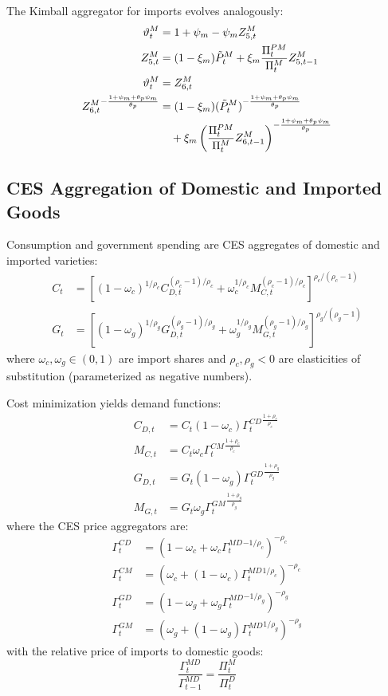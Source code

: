 \documentclass[12pt]{article}
\begin{document}
The Kimball aggregator for imports evolves analogously:
\begin{align}
\vartheta_t^M &= 1 + \psi_m - \psi_m Z_{5,t}^M \\
Z_{5,t}^M &= (1-\xi_m) \tilde{P}_t^M + \xi_m \frac{\Pi_t^{PM}}{\Pi_t^M} Z_{5,t-1}^M \\
\vartheta_t^M &= Z_{6,t}^M \\
Z_{6,t}^M {}^{-\frac{1+\psi_m+\theta_p\psi_m}{\theta_p}} &= (1-\xi_m) (\tilde{P}_t^M)^{-\frac{1+\psi_m+\theta_p\psi_m}{\theta_p}} \notag \\
&\quad + \xi_m \left( \frac{\Pi_t^{PM}}{\Pi_t^M} Z_{6,t-1}^M \right)^{-\frac{1+\psi_m+\theta_p\psi_m}{\theta_p}}
\end{align}

\subsection{CES Aggregation of Domestic and Imported Goods}

Consumption and government spending are CES aggregates of domestic and imported varieties:
\begin{align}
C_t &= \left[ (1-\omega_c)^{1/\rho_c} C_{D,t}^{(\rho_c-1)/\rho_c} + \omega_c^{1/\rho_c} M_{C,t}^{(\rho_c-1)/\rho_c} \right]^{\rho_c/(\rho_c-1)} \\
G_t &= \left[ (1-\omega_g)^{1/\rho_g} G_{D,t}^{(\rho_g-1)/\rho_g} + \omega_g^{1/\rho_g} M_{G,t}^{(\rho_g-1)/\rho_g} \right]^{\rho_g/(\rho_g-1)}
\end{align}
where $\omega_c, \omega_g \in (0,1)$ are import shares and $\rho_c, \rho_g < 0$ are elasticities of substitution (parameterized as negative numbers).

Cost minimization yields demand functions:
\begin{align}
C_{D,t} &= C_t (1-\omega_c) \Gamma_t^{CD} {}^{\frac{1+\rho_c}{\rho_c}} \\
M_{C,t} &= C_t \omega_c \Gamma_t^{CM} {}^{\frac{1+\rho_c}{\rho_c}} \\
G_{D,t} &= G_t (1-\omega_g) \Gamma_t^{GD} {}^{\frac{1+\rho_g}{\rho_g}} \\
M_{G,t} &= G_t \omega_g \Gamma_t^{GM} {}^{\frac{1+\rho_g}{\rho_g}}
\end{align}
where the CES price aggregators are:
\begin{align}
\Gamma_t^{CD} &= (1 - \omega_c + \omega_c \Gamma_t^{MD} {}^{-1/\rho_c})^{-\rho_c} \\
\Gamma_t^{CM} &= (\omega_c + (1-\omega_c) \Gamma_t^{MD} {}^{1/\rho_c})^{-\rho_c} \\
\Gamma_t^{GD} &= (1 - \omega_g + \omega_g \Gamma_t^{MD} {}^{-1/\rho_g})^{-\rho_g} \\
\Gamma_t^{GM} &= (\omega_g + (1-\omega_g) \Gamma_t^{MD} {}^{1/\rho_g})^{-\rho_g}
\end{align}
with the relative price of imports to domestic goods:
\begin{equation}
\frac{\Gamma_t^{MD}}{\Gamma_{t-1}^{MD}} = \frac{\Pi_t^M}{\Pi_t^D}
\end{equation}
\end{document}
